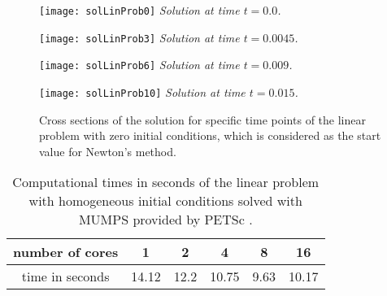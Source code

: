 \documentclass[12pt]{article}
\numberwithin{equation}{section}
\begin{document}
\begin{figure}[tbhp]
\begin{minipage}{0.47\linewidth}
\begin{center}
\texttt{[image: solLinProb0]} 
\textit{Solution at time $t = 0.0$.}
\end{center} 
\end{minipage}
\hfill
\vspace{0.2 cm}
\begin{minipage}{0.47\linewidth}
\begin{center}
\texttt{[image: solLinProb3]} 
\textit{Solution at time $t = 0.0045$.}
\end{center}
\end{minipage}
\vfill
\vspace{0.2 cm}
\begin{minipage}{0.47\linewidth}
\begin{center}
\texttt{[image: solLinProb6]} 
\textit{Solution at time $t = 0.009$.}
\end{center}
\end{minipage}
\hfill
\begin{minipage}{0.47\linewidth}
\begin{center}
\texttt{[image: solLinProb10]} 
\textit{Solution at time $t = 0.015$.}
\end{center}
\end{minipage}
\caption{Cross sections of the solution for specific time points of the linear problem with zero initial conditions, which is considered as the start value for Newton's method.}
\label{fig:sol_lin_prob_initial_val}
\end{figure}


\begin{table}
\caption{Computational times in seconds of the linear problem with homogeneous initial conditions solved with MUMPS provided by PETSc \cite{DaPaKlCo2011}.}
\label{table:speedup_table_linprob_mumps}
\begin{center}
\begin{tabular}[tbhp]{ |c|c|c|c|c|c| } 
 \hline
 number of cores & 1 & 2 & 4 & 8 & 16\\
 \hline
 time in seconds & 14.12 & 12.2 & 10.75 & 9.63 & 10.17 \\ 
 \hline
\end{tabular}
\end{center}
\end{table}
\end{document}
